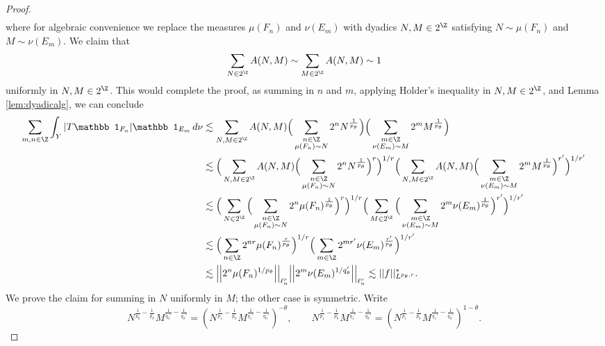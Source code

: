 \documentclass[reqno]{amsart}
\theoremstyle{definition}
\theoremstyle{remark}
\begin{document}
\begin{proof}
\begin{align*}
		 \end{align*}
	where for algebraic convenience we replace the measures $\mu(F_n)$ and $\nu(E_m)$ with dyadics $N, M \in 2^\Z$ satisfying $N \sim \mu(F_n)$ and $M \sim \nu(E_m)$. We claim that 
		\[ \sum_{N \in 2^\Z} A(N, M) \sim \sum_{M \in 2^\Z} A(N, M) \sim 1 \]
	uniformly in $N, M \in 2^\Z$. This would complete the proof, as summing in $n$ and $m$, applying Holder's inequality in $N, M \in 2^\Z$, and Lemma \ref{lem:dyadicalg}, we can conclude
		\begin{align*}
			\sum_{m, n \in \Z} \int_Y |T \mathbb 1_{F_n}| \mathbb 1_{E_m} \, d\nu
				&\lesssim \sum_{N, M \in 2^\Z} A(N, M) \Big( \sum_{\substack{n \in \Z \\ \mu(F_n) \sim N}} 2^n N^{\frac{1}{p_\theta}} \Big) \Big( \sum_{\substack{m \in \Z \\ \nu(E_m) \sim M}} 2^m M^{\frac{1}{p_\theta}} \Big) \\
				&\lesssim \Big(\sum_{N, M \in 2^\Z} A(N, M) \Big( \sum_{\substack{n \in \Z \\ \mu(F_n) \sim N}} 2^n N^{\frac{1}{p_\theta}} \Big)^r \Big)^{1/r} \Big(\sum_{N, M \in 2^\Z} A(N, M) \Big( \sum_{\substack{m \in \Z \\ \nu(E_m) \sim M}} 2^m M^{\frac{1}{p_\theta}} \Big)^{r'} \Big)^{1/r'}\\
				&\lesssim \Big(\sum_{N \in 2^\Z}  \Big( \sum_{\substack{n \in \Z \\ \mu(F_n) \sim N}} 2^n \mu(F_n)^{\frac{1}{p_\theta}} \Big)^r \Big)^{1/r} \Big(\sum_{M \in 2^\Z} \Big( \sum_{\substack{m \in \Z \\ \nu(E_m) \sim M}} 2^m \nu(E_m)^{\frac{1}{p_\theta}} \Big)^{r'} \Big)^{1/r'}\\
				&\lesssim \Big(  \sum_{n \in \Z }   2^{nr} \mu(F_n)^{\frac{r}{p_\theta}}  \Big)^{1/r} \Big(  \sum_{m \in \Z} 2^{mr'} \nu(E_m)^{\frac{r'}{p_\theta}} \Big)^{1/r'}\\
				&\lesssim \Big|\Big| 2^n \mu(F_n)^{1/p_\theta} \Big|\Big|_{\ell^r_n} \Big|\Big| 2^m \nu(E_m)^{1/q_\theta'}\Big|\Big|_{\ell^r_n} \lesssim ||f||^*_{L^{p_\theta, r}}.
		\end{align*}
	We prove the claim for summing in $N$ uniformly in $M$; the other case is symmetric. Write
		\[ N^{\frac{1}{p_0} - \frac{1}{p_\theta}} M^{\frac{1}{q_0'} - \frac{1}{q_\theta'}} = \left( N^{\frac{1}{p_1} - \frac{1}{p_0}} M^{\frac{1}{q_1'} - \frac{1}{q_0'}} \right)^{-\theta}, \qquad  N^{\frac{1}{p_1} - \frac{1}{p_\theta}} M^{\frac{1}{q_1'} - \frac{1}{q_\theta'}}  = \left( N^{\frac{1}{p_1} - \frac{1}{p_0}} M^{\frac{1}{q_1'} - \frac{1}{q_0'}}  \right)^{1 - \theta}. \]

\end{proof}
\end{document}

